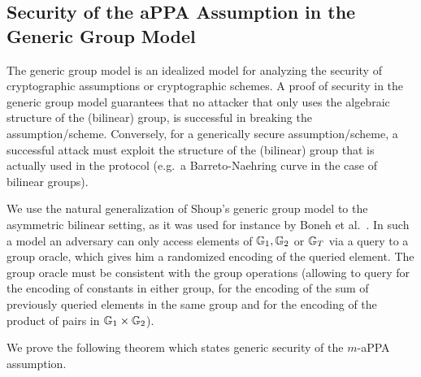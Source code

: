 \subsection{Security of the aPPA Assumption in the Generic Group Model}

The generic group model is an idealized model for analyzing the security of cryptographic assumptions or cryptographic schemes. A proof of security in the generic group model guarantees that no attacker that only uses the algebraic structure of the (bilinear) group, is successful in breaking the assumption/scheme. Conversely, for a generically secure assumption/scheme, a successful attack must exploit the structure of the (bilinear) group that is actually used in the protocol (e.g.~a Barreto-Naehring curve in the case of bilinear groups).  

We use the natural generalization of Shoup's generic group model \cite{EC:Shoup97} to the asymmetric bilinear setting, as it was used for instance by Boneh et al.~\cite{EC:BonBoyGoh05}. In such a model an adversary can only access elements of $\mathbb{G}_1,\mathbb{G}_2$ or $\mathbb{G}_T$ via a query to a group oracle, which gives him a randomized  encoding of the queried element. The group oracle must be consistent with the group operations (allowing to query for the encoding of constants in either group, for the encoding of the sum of previously queried elements in the same group and for the encoding of the product of pairs in $\mathbb{G}_1\times \mathbb{G}_2$).

We prove the following theorem which states generic security of the $m$-aPPA assumption.

